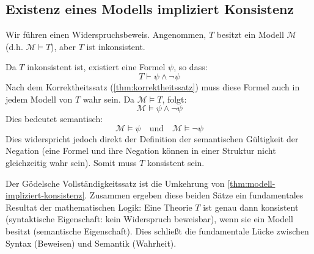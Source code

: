 \subsection{Existenz eines Modells impliziert Konsistenz}
\begin{math-stroke}

\begin{short-proof}
Wir führen einen Widerspruchsbeweis. Angenommen, $T$ besitzt ein Modell $\mathcal{M}$ (d.h. $\mathcal{M} \models T$), aber $T$ ist inkonsistent.
        
Da $T$ inkonsistent ist, existiert eine Formel $\psi$, so dass:
\[ T \vdash \psi \land \neg \psi \]
Nach dem Korrektheitssatz (\cref{thm:korrektheitssatz}) muss diese Formel auch in jedem Modell von $T$ wahr sein. Da $\mathcal{M} \models T$, folgt:
\[ \mathcal{M} \models \psi \land \neg \psi \]
Dies bedeutet semantisch:
\[ \mathcal{M} \models \psi \quad \text{und} \quad \mathcal{M} \models \neg \psi \]
Dies widerspricht jedoch direkt der Definition der semantischen Gültigkeit der Negation (eine Formel und ihre Negation können in einer Struktur nicht gleichzeitig wahr sein). Somit muss $T$ konsistent sein.
\end{short-proof}
\end{math-stroke}

\begin{ai-global-state-checkpoint-invisible-content}
\end{ai-global-state-checkpoint-invisible-content}

\begin{math-stroke}

\begin{explanation-of-steps}
Der Gödelsche Vollständigkeitssatz ist die Umkehrung von \cref{thm:modell-impliziert-konsistenz}. Zusammen ergeben diese beiden Sätze ein fundamentales Resultat der mathematischen Logik: Eine Theorie $T$ ist genau dann konsistent (syntaktische Eigenschaft: kein Widerspruch beweisbar), wenn sie ein Modell besitzt (semantische Eigenschaft). Dies schließt die fundamentale Lücke zwischen Syntax (Beweisen) und Semantik (Wahrheit).
\end{explanation-of-steps}
\end{math-stroke}

